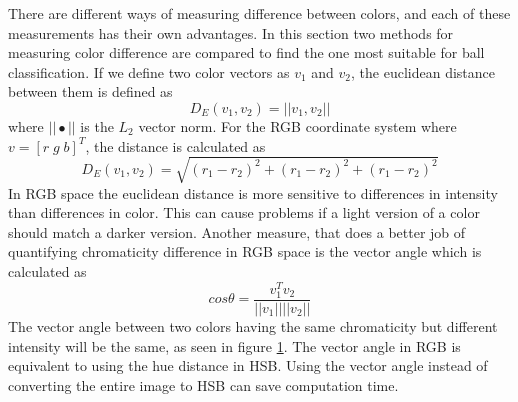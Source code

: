 There are different ways of measuring difference between colors, and each of these measurements has their own advantages. In this section two methods for measuring color difference are compared to find the one most suitable for ball classification.
If we define two color vectors as $v_{1}$ and $v_{2}$, the euclidean distance between them is defined as
\begin{equation}
D_{E}(v_{1}, v_{2}) = ||v_{1}, v_{2}||
\end{equation}
where $||\bullet||$ is the $L_{2}$ vector norm. For the RGB coordinate system where $v = [r\;g\;b]^{T}$, the distance is calculated as
\begin{equation}
D_{E}(v_{1}, v_{2}) = \sqrt{(r_{1} - r_{2})^{2} + (r_{1} - r_{2})^{2} + (r_{1} - r_{2})^{2}}
\end{equation}
In RGB space the euclidean distance is more sensitive to differences in intensity than differences in color. This can cause problems if a light version of a color should match a darker version. Another measure, that does a better job of quantifying chromaticity difference in RGB space is the vector angle which is calculated as
\begin{equation}
cos \theta = \frac{v_{1}^ Tv_{2}}{||v_{1}|| ||v_{2}||}
\end{equation}
The vector angle between two colors having the same chromaticity but different intensity will be the same, as seen in figure \ref{fig:angleVersusEuclidean}. The vector angle in RGB is equivalent to using the hue distance in HSB. Using the vector angle instead of converting the entire image to HSB can save computation time.\cite{angleVsEuclidean}
\begin{figure}[H]
  \centering
  \quad           
\label{fig:angleVersusEuclidean}
\end{figure}
